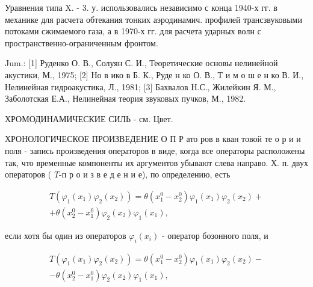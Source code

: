 \documentclass[10pt]{article}
\begin{document}
Уравнения типа X. - 3. у. использовались независимо с конца 1940-х гг. в механике для расчета обтекания тонких аэродинамич. профилей трансзвуковыми потоками сжимаемого газа, а в 1970-х гг. для расчета ударных волн с пространственно-ограниченным фронтом.



Jum.: [1] Руденко О. В., Солуян С. И., Теоретические основы нелинейной акустики, М., 1975; [2] Но в ико в Б. К., Руде н ко О. В., Т и м о ш е н ко В. И., Нелинейная гидроакустика, Л., 1981; [3] Бахвалов Н.С., Жилейкин Я. М., Заболотская Е.А., Нелинейная теория звуковых пучков, М., 1982.



ХРОМОДИНАМИЧЕСКИЕ СИЛЬ - см. Цвет.



ХРОНОЛОГИЧЕСКОЕ ПРОИЗВЕДЕНИЕ О П Р ато ров в кван товой те о р и и поля - запись произведения операторов в виде, когда все операторы расположены так, что временные компоненты их аргументов убывают слева направо. Х. п. двух операторов ( $T$-п р о и з в е д е н и е), по определению, есть



\[

\begin{gathered}

T\left(\varphi_{1}\left(x_{1}\right) \varphi_{2}\left(x_{2}\right)\right)=\theta\left(x_{1}^{0}-x_{2}^{0}\right) \varphi_{1}\left(x_{1}\right) \varphi_{2}\left(x_{2}\right)+ \\

+\theta\left(x_{2}^{0}-x_{1}^{0}\right) \varphi_{2}\left(x_{2}\right) \varphi_{1}\left(x_{1}\right),

\end{gathered}

\]



если хотя бы один из операторов $\varphi_{i}\left(x_{i}\right)$ - оператор бозонного поля, и



\[

\begin{gathered}

T\left(\varphi_{1}\left(x_{1}\right) \varphi_{2}\left(x_{2}\right)\right)=\theta\left(x_{1}^{0}-x_{2}^{0}\right) \varphi_{1}\left(x_{1}\right) \varphi_{2}\left(x_{2}\right)- \\

-\theta\left(x_{2}^{0}-x_{1}^{0}\right) \varphi_{2}\left(x_{2}\right) \varphi_{1}\left(x_{1}\right),

\end{gathered}

\]
\end{document}
